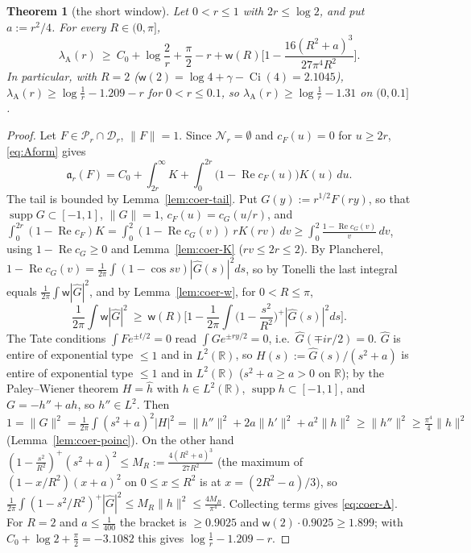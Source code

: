 \documentclass[10pt]{amsart}
\newtheorem{theorem}{Theorem}[section]
\theoremstyle{definition}
\theoremstyle{remark}
\newcommand{\R}{\mathbb R}
\newcommand{\Rel}{\operatorname{Re}}
\newcommand{\supp}{\operatorname{supp}}
\newcommand{\cF}{c_F}
\begin{document}
\begin{theorem}[the short window]\label{thm:coer-A}
Let $0<r\le1$ with $2r\le\log2$, and put $a:=r^2/4$. For every $R\in(0,\pi]$,
\begin{equation}\label{eq:coer-A}
\lambda_{\mathrm A}(r)\ \ge\ C_0+\log\frac2r+\frac\pi2-r+\mathsf w(R)\Big[1-\frac{16(R^2+a)^3}{27\pi^4R^2}\Big].
\end{equation}
In particular, with $R=2$ ($\mathsf w(2)=\log4+\gamma-\operatorname{Ci}(4)=2.1045$),
$\lambda_{\mathrm A}(r)\ge\log\frac1r-1.209-r$ for $0<r\le0.1$, so $\lambda_{\mathrm A}(r)\ge\log\frac1r-1.31$ on $(0,0.1]$.
\end{theorem}
\begin{proof}
Let $F\in\mathcal P_r\cap\mathcal D_r$, $\|F\|=1$. Since $\mathcal N_r=\emptyset$ and $\cF(u)=0$ for $u\ge2r$, \eqref{eq:Aform} gives
\[
\mathfrak a_r(F)=C_0+\int_{2r}^\infty K+\int_0^{2r}\big(1-\Rel\cF(u)\big)K(u)\,du .
\]
The tail is bounded by Lemma~\ref{lem:coer-tail}. Put $G(y):=r^{1/2}F(ry)$, so that $\supp G\subset[-1,1]$, $\|G\|=1$,
$\cF(u)=c_G(u/r)$, and $\int_0^{2r}(1-\Rel\cF)K=\int_0^2(1-\Rel c_G(v))\,rK(rv)\,dv\ge\int_0^2\frac{1-\Rel c_G(v)}v\,dv$, using
$1-\Rel c_G\ge0$ and Lemma~\ref{lem:coer-K} ($rv\le2r\le2$). By Plancherel, $1-\Rel c_G(v)=\frac1{2\pi}\int(1-\cos sv)|\widehat G(s)|^2ds$,
so by Tonelli the last integral equals $\frac1{2\pi}\int\mathsf w|\widehat G|^2$, and by Lemma~\ref{lem:coer-w}, for $0<R\le\pi$,
\[
\frac1{2\pi}\int\mathsf w|\widehat G|^2\ \ge\ \mathsf w(R)\Big[1-\frac1{2\pi}\int\Big(1-\frac{s^2}{R^2}\Big)^+|\widehat G(s)|^2ds\Big].
\]
The Tate conditions $\int Fe^{\pm t/2}=0$ read $\int Ge^{\pm ry/2}=0$, i.e.\ $\widehat G(\mp ir/2)=0$. $\widehat G$ is entire of
exponential type $\le1$ and in $L^2(\R)$, so $H(s):=\widehat G(s)/(s^2+a)$ is entire of exponential type $\le1$ and in $L^2(\R)$
($s^2+a\ge a>0$ on $\R$); by the Paley--Wiener theorem $H=\widehat h$ with $h\in L^2(\R)$, $\supp h\subset[-1,1]$, and
$G=-h''+ah$, so $h''\in L^2$. Then
$1=\|G\|^2=\frac1{2\pi}\int(s^2+a)^2|H|^2=\|h''\|^2+2a\|h'\|^2+a^2\|h\|^2\ge\|h''\|^2\ge\frac{\pi^4}4\|h\|^2$
(Lemma~\ref{lem:coer-poinc}). On the other hand $(1-\frac{s^2}{R^2})^+(s^2+a)^2\le M_R:=\frac{4(R^2+a)^3}{27R^2}$ (the
maximum of $(1-x/R^2)(x+a)^2$ on $0\le x\le R^2$ is at $x=(2R^2-a)/3$), so
$\frac1{2\pi}\int(1-s^2/R^2)^+|\widehat G|^2\le M_R\|h\|^2\le\frac{4M_R}{\pi^4}$. Collecting terms gives \eqref{eq:coer-A}. For
$R=2$ and $a\le\frac1{400}$ the bracket is $\ge0.9025$ and $\mathsf w(2)\cdot0.9025\ge1.899$; with
$C_0+\log2+\frac\pi2=-3.1082$ this gives $\log\frac1r-1.209-r$.
\end{proof}
\end{document}
